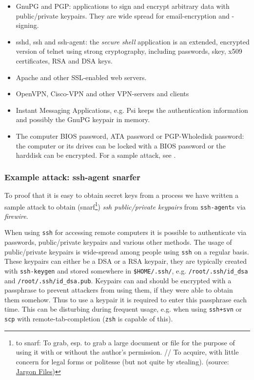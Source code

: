\begin{itemize}

	\item GnuPG and PGP: applications to sign and encrypt arbitrary data
	with public/private keypairs. They are wide spread for email-encryption
	and -signing.

	\item sshd, ssh and ssh-agent: the \emph{secure shell} application is an
	extended, encrypted version of telnet using strong cryptography,
	including passwords, skey, x509 certificates, RSA and DSA keys.

	\item Apache and other SSL-enabled web servers.

	\item OpenVPN, Cisco-VPN and other VPN-servers and clients

	\item Instant Messaging Applications, e.g\@. Psi keeps the
	authentication information and possibly the GnuPG keypair in memory.

	\item The computer BIOS password, ATA password or PGP-Wholedisk
		password: the computer or its drives can be locked with a BIOS
		password or the harddisk can be encrypted. For a sample attack,
		see \cite{rux2k6firewire:2006}.

\end{itemize}


\subsubsection{Example attack: ssh-agent snarfer}

\label{ssh-agent-snarfer} To proof that it is easy to obtain secret keys from a
process we have written a sample attack to obtain
%
(snarf\footnote{to snarf: To grab, esp. to grab a large document or file for the
purpose of using it with or without the author's permission. // To acquire, with
little concern for legal forms or politesse (but not quite by stealing).
(source: \href{http://catb.org/jargon/html/S/snarf.html}{Jargon Files})})
%
\emph{ssh public/private keypairs} from \texttt{ssh-agent}s via \emph{firewire}.

When using \texttt{ssh} for accessing remote computers it is possible to
authenticate via passwords, public/private keypairs and various other methods.
The usage of public/private keypairs is wide-spread among people using
\texttt{ssh} on a regular basis. These keypairs can either be a DSA or a RSA
keypair, they are typically created with \texttt{ssh-keygen} and stored
somewhere in \texttt{\$HOME/.ssh/}, e.g\@. \texttt{/root/.ssh/id\_dsa} and
\texttt{/root/.ssh/id\_dsa.pub}. Keypairs can and should be encrypted with a
passphrase to prevent attackers from using them, if they were able to obtain
them somehow. Thus to use a keypair it is required to enter this passphrase each
time. This can be disturbing during frequent usage, e.g\@. when using
\texttt{ssh+svn} or \texttt{scp} with remote-tab-completion (\texttt{zsh} is
capable of this).

